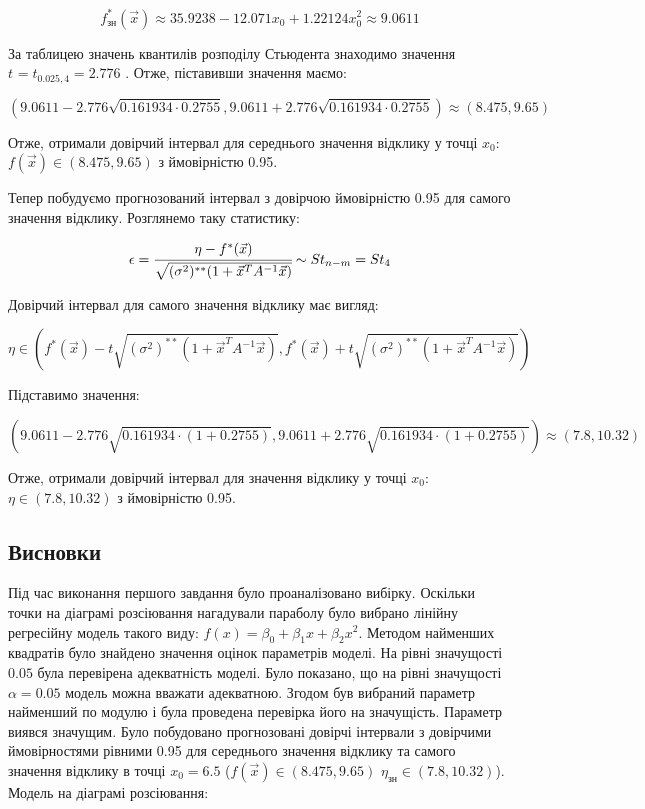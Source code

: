 \documentclass[a5paper, 20pt]{article}
\begin{document}
$$
f^*_{\text{зн}}(\vec{x}) \approx  35.9238 -12.071x_0 + 1.22124 x_0^2 \approx 9.0611 
$$

За таблицею значень квантилів розподілу Стьюдента знаходимо значення $t_{} = t_{0.025, 4} = 2.776$ . Отже, піставивши значення маємо:

$$ \left(9.0611  - 2.776\sqrt{0.161934 \cdot 0.2755}, 9.0611 + 2.776\sqrt{0.161934 \cdot 0.2755} \right) \approx (8.475, 9.65)$$

Отже, отримали довірчий інтервал для середнього значення відклику у точці $x_0:$ $f(\vec{x}) \in (8.475, 9.65)$ з ймовірністю 0.95.

Тепер побудуємо прогнозований інтервал з довірчою ймовірністю 0.95  для самого значення відклику. Розглянемо таку статистику:

$$ \epsilon =  \cfrac{\eta - f^{*}(\vec{x})}{\sqrt{(\sigma^2)^{**}  ( 1 + \vec{x}^T A^{-1} \vec{x}) }} \sim St_{n-m} = St_4$$

Довірчий інтервал для самого значення відклику має вигляд:

$$ \eta \in \left( f^*(\vec{x}) - t\sqrt{(\sigma^2)^{**}  ( 1 + \vec{x}^T A^{-1} \vec{x})},  f^*(\vec{x}) + t\sqrt{(\sigma^2)^{**}  ( 1 + \vec{x}^T A^{-1} \vec{x})} \right) $$

Підставимо значення:

$$ \left(9.0611  - 2.776 \sqrt{0.161934\cdot(1 +  0.2755)},  9.0611  +  2.776 \sqrt{0.161934\cdot(1 +  0.2755)} \right) \approx (7.8,  10.32) $$

Отже, отримали довірчий інтервал для значення відклику у точці $x_0:$ $\eta \in  (7.8,  10.32)$ з ймовірністю 0.95.

\subsection{Висновки}

Під час виконання першого завдання було проаналізовано вибірку. Оскільки точки на діаграмі розсіювання нагадували параболу було вибрано лінійну регресійну модель такого виду: 
$f(x) = \beta_0 + \beta_1 x + \beta_2 x^2$. Методом найменших квадратів було знайдено значення оцінок параметрів моделі. На рівні значущості $0.05$ була перевірена адекватність моделі. Було показано, що на рівні значущості $\alpha = 0.05$ модель можна вважати адекватною. Згодом був вибраний параметр найменший по модулю і була проведена перевірка його на значущість. Параметр виявся значущим. Було побудовано прогнозовані довірчі інтервали з довірчими ймовірностями рівними 0.95 для середнього значення відклику та самого значення відклику в точці $x_0 = 6.5$ ($f(\vec{x}) \in (8.475, 9.65)$ $\eta_{\text{зн}} \in  (7.8,  10.32)$). Модель на діаграмі розсіювання:
\end{document}
